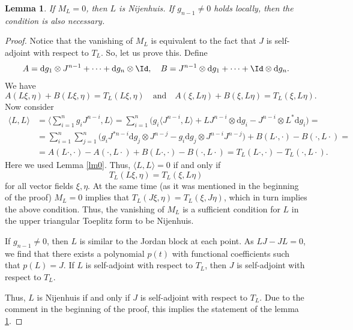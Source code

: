 \documentclass[12pt]{article}
\newtheorem{Lemma}{Lemma}[section]
\theoremstyle{remark}
\newcommand{\ddd}{\mathrm{d}}
\begin{document}
\begin{Lemma}\label{lm1}
If $M_L = 0$, then $L$ is Nijenhuis. If $g_{n - 1} \neq 0$ holds locally, then the condition is also necessary.
\end{Lemma}    
\begin{proof}
Notice that the vanishing of $M_L$ is equivalent to the fact that $J$ is self-adjoint with respect to $T_L$. So, let us prove this. Define
$$
A = \ddd g_1 \otimes J^{n - 1} + \dots + \ddd g_n \otimes \Id, \quad B = J^{n - 1} \otimes \ddd g_1  + \dots + \Id \otimes \ddd g_n.
$$
We have
$$
A(L\xi, \eta) + B(L \xi, \eta) = T_L(L\xi, \eta) \quad \text{and} \quad A(\xi, L\eta) + B(\xi, L\eta) = T_L(\xi, L\eta).
$$
Now consider
$$
\begin{aligned}
\langle L, L \rangle & = \langle \sum_{i = 1}^n g_i J^{n - i}, L \rangle = \sum_{i = 1}^n \Bigg( g_i \langle J^{n - i}, L \rangle + LJ^{n - i} \otimes \ddd g_i - J^{n - i} \otimes L^* \ddd g_i\Bigg) = \\
& = \sum_{i = 1}^n \sum_{j = 1}^n \Bigg(g_i J^{* n - i} \ddd g_j \otimes J^{n - j} -  g_i \ddd g_j \otimes J^{n - i} J^{n - j}\Bigg) + B(L \cdot, \cdot) - B(\cdot, L\cdot)  = \\
& = A(L\cdot, \cdot) - A(\cdot, L \cdot) + B(L \cdot, \cdot) - B(\cdot, L\cdot) = T_L(L\cdot, \cdot) - T_L(\cdot, L\cdot).
\end{aligned}
$$
Here we used Lemma \eqref{lm0}. Thus, $\langle L, L \rangle = 0$ if and only if
$$
T_L(L\xi, \eta) = T_L(\xi, L\eta)
$$
for all vector fields $\xi, \eta$. At the same time (as it was mentioned in the beginning of the proof) $M_L = 0$ implies that $T_L(J\xi, \eta) = T_L(\xi, J\eta)$, which in turn implies the above condition. Thus, the vanishing of $M_L$ is a sufficient condition for $L$ in the upper triangular Toeplitz form to be Nijenhuis.

If $g_{n - 1} \neq 0$, then $L$ is similar to the Jordan block at each point. As $LJ - JL = 0$, we find that there exists a polynomial $p(t)$ with functional coefficients such that $p(L) = J$. If $L$ is self-adjoint with respect to $T_L$, then $J$ is self-adjoint with respect to $T_L$. 

Thus, $L$ is Nijenhuis if and only if $J$ is self-adjoint with respect to $T_L$. Due to the comment in the beginning of the proof, this implies the statement of the lemma \ref{lm1}.
\end{proof}
\end{document}
